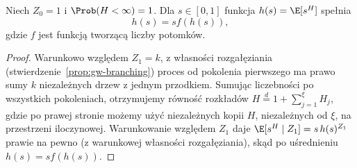 \begin{stwierdzenie}
Niech $Z_0=1$ i $\Prob(H<\infty)=1$.
Dla $s\in[0,1]$ funkcja $h(s)=\E[s^H]$ spełnia
\[
h(s)=s f(h(s)),
\]
gdzie $f$ jest funkcją tworzącą liczby potomków.
\end{stwierdzenie}
\begin{proof}
Warunkowo względem $Z_1=k$, z własności
rozgałęziania (stwierdzenie~\ref{prop:gw-branching})
proces od pokolenia pierwszego ma prawo sumy
$k$ niezależnych drzew z jednym przodkiem.
Sumując liczebności po wszystkich pokoleniach,
otrzymujemy równość rozkładów
$H\overset{d}=1+\sum_{j=1}^\xi H_j$, gdzie po prawej
stronie możemy użyć niezależnych kopii $H$,
niezależnych od $\xi$, na przestrzeni iloczynowej.
Warunkowanie względem $Z_1$ daje
$\E[s^H\mid Z_1]=s\,h(s)^{Z_1}$ prawie na pewno
(z warunkowej własności rozgałęziania), skąd po
uśrednieniu $h(s)=sf(h(s))$.
\end{proof}

